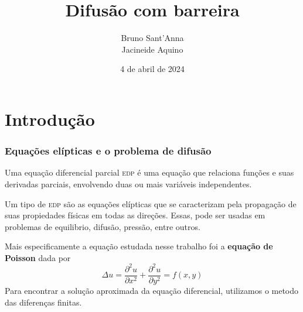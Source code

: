 \documentclass[xcolor=dvipsnames, aspectratio=169]{beamer}
\title{Difusão com barreira}
\author{Bruno Sant'Anna\\Jacineide Aquino}
\date{4 de abril de 2024}
\institute{Universidade Federal de Sergipe}
\begin{document}
    \begin{frame}   
        \maketitle
    \end{frame}
    \section{Introdução}
    \begin{frame}
        \frametitle{Equações elípticas e o problema de difusão}
        Uma equação diferencial parcial \textsc{edp} é uma equação que relaciona funções e suas derivadas parciais, envolvendo duas ou mais variáveis independentes.

        Um tipo de \textsc{edp} são as equações elípticas que se caracterizam pela propagação de suas propiedades físicas em todas as direções. Essas, pode ser usadas em problemas de equilibrio, difusão, pressão, entre outros. 

        Mais especificamente a equação estudada nesse trabalho foi a \textbf{equação de Poisson} dada por
        \[
            \Delta u = \dfrac{\partial^2 u}{\partial x^2} + \dfrac{\partial^2 u}{\partial y^2} = f(x,y)
        \]
        Para encontrar a solução aproximada da equação diferencial, utilizamos o metodo das diferenças finitas.
    \end{frame}
\end{document}
